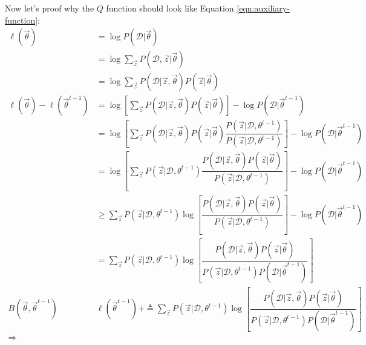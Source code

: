 Now let's proof why the $Q$ function should look like Equation \eqref{eqn:auxiliary-function}:
\begin{align}
\ell(\vec{\theta}) &= \log{P(\mathcal{D}|\vec{\theta})}  \nonumber \\
                &= \log{{\sum\limits_{\vec{z}} P(\mathcal{D},\vec{z}|\vec{\theta})}} \nonumber \\
				&= \log{{\sum\limits_{\vec{z}} P(\mathcal{D}|\vec{z},\vec{\theta})P(\vec{z}|\vec{\theta})}} \nonumber \\
\ell(\vec{\theta})-\ell(\vec{\theta}^{t-1}) &= \log\left[\sum\limits_{\vec{z}} P(\mathcal{D}|\vec{z},\vec{\theta})P(\vec{z}|\vec{\theta})\right] - \log{P(\mathcal{D}|\vec{\theta}^{t-1})} \nonumber \\
                &= \log\left[\sum\limits_{\vec{z}} P(\mathcal{D}|\vec{z},\vec{\theta})P(\vec{z}|\vec{\theta})\dfrac{P(\vec{z}|\mathcal{D},\theta^{t-1})}{P(\vec{z}|\mathcal{D},\theta^{t-1})}\right] - \log{P(\mathcal{D}|\vec{\theta}^{t-1})} \nonumber \\
				&= \log\left[\sum\limits_{\vec{z}} P(\vec{z}|\mathcal{D},\theta^{t-1})\dfrac{P(\mathcal{D}|\vec{z},\vec{\theta})P(\vec{z}|\vec{\theta})}{P(\vec{z}|\mathcal{D},\theta^{t-1})}\right] - \log{P(\mathcal{D}|\vec{\theta}^{t-1})} \nonumber \\
				&\geq \sum\limits_{\vec{z}} P(\vec{z}|\mathcal{D},\theta^{t-1})\log\left[\dfrac{P(\mathcal{D}|\vec{z},\vec{\theta})P(\vec{z}|\vec{\theta})}{P(\vec{z}|\mathcal{D},\theta^{t-1})}\right] - \log{P(\mathcal{D}|\vec{\theta}^{t-1})} \nonumber \\
				&= \sum\limits_{\vec{z}} P(\vec{z}|\mathcal{D},\theta^{t-1})\log\left[\dfrac{P(\mathcal{D}|\vec{z},\vec{\theta})P(\vec{z}|\vec{\theta})}{P(\vec{z}|\mathcal{D},\theta^{t-1})P(\mathcal{D}|\vec{\theta}^{t-1})}\right] \nonumber \\
				B(\vec{\theta},\vec{\theta}^{t-1}) & \ell(\vec{\theta}^{t-1})+\triangleq \sum\limits_{\vec{z}} P(\vec{z}|\mathcal{D},\theta^{t-1})\log\left[\dfrac{P(\mathcal{D}|\vec{z},\vec{\theta})P(\vec{z}|\vec{\theta})}{P(\vec{z}|\mathcal{D},\theta^{t-1})P(\mathcal{D}|\vec{\theta}^{t-1})}\right] \\
\Rightarrow & \nonumber
\end{align}

